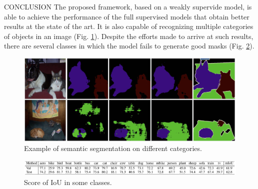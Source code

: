 \begin{frame}{CONCLUSION}
    The proposed framework, based on a weakly supervide model, is able to 
    achieve the performance of the full supervised models that obtain better 
    results at the state of the art. It is also capable of recognizing multiple categories of objects in an image (Fig. \ref{fig:segmentationCategories}). Despite the efforts made to arrive at such 
    results, there are several classes in which the model fails to generate 
    good masks (Fig. \ref{fig:classes}).
    \begin{figure}[h!]
        \centering
        \includegraphics[width = 0.6 \linewidth]{images/paper6/multiple segmentation.png}
        \centering
        \caption{Example of semantic segmentation on different categories.}
        \label{fig:segmentationCategories}
    \end{figure}
    \begin{figure}[h!]
        \centering
        \includegraphics[width = 1 \linewidth]{images/paper6/classes.png}
        \centering
        \caption{Score of IoU in some classes.}
        \label{fig:classes}
    \end{figure}
\end{frame}





